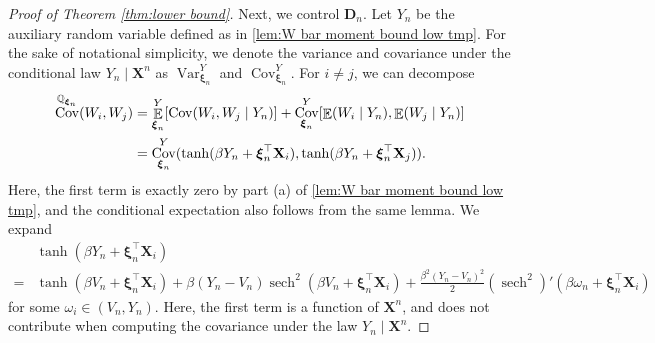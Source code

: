 \documentclass[preprint,reqno]{imsart}
\DeclareMathOperator{\sech}{sech}
\DeclareMathOperator{\EE}{\mathbb{E}}
\DeclareMathOperator{\Var}{Var}
\DeclareMathOperator{\Cov}{Cov}
\DeclareMathOperator{\QQ}{\mathbb{Q}}
\newcommand{\X}{\mathbf{X}}
\newcommand{\xxi}{\boldsymbol \xi}
\begin{document}
\begin{appendix}
\begin{proof}[Proof of Theorem \ref{thm:lower bound}]
\vspace{2mm}
Next, we control $\mathbf{D}_n$. Let $Y_n$ be the auxiliary random variable defined as in \cref{lem:W bar moment bound low tmp}.
%
%
%
For the sake of notational simplicity, we denote the variance and covariance under the conditional law $Y_n \mid \X^n$ as $\Var_{\xxi_n}^{Y}$ and $\Cov_{\xxi_n}^Y$.
For $i \neq j$, we can decompose
\begin{align}
    \Cov^{\QQ_{\xxi_n}} (W_i, W_j) &= \EE_{\xxi_n}^{Y} [\Cov (W_i, W_j \mid Y_n)] + \Cov_{\xxi_n}^{Y} [\EE (W_i \mid Y_n), \EE (W_j \mid Y_n)] \label{eq:cov} \\
    &= \Cov_{\xxi_n}^{Y} ( \tanh(\beta Y_n + \xxi_n^\top \X_i), \tanh(\beta Y_n + \xxi_n^\top \X_j) ). \notag
\end{align}
Here, the first term is exactly zero by part (a) of \cref{lem:W bar moment bound low tmp}, and the conditional expectation also follows from the same lemma.
We expand
\begin{align*}
&\tanh(\beta Y_n + \xxi_n^\top \X_i) \\
=& \tanh(\beta V_n + \xxi_n^\top \X_i) + \beta (Y_n - V_n) \sech^2(\beta V_n + \xxi_n^\top \X_i) + \frac{\beta^2 (Y_n - V_n)^2}{2} (\sech^2)'(\beta \omega_n + \xxi_n^\top \X_i)
%
\end{align*}
for some $\omega_i \in (V_n, Y_n)$. Here, the first term is a function of $\X^n$, and does not contribute when computing the covariance under the law $Y_n \mid \X^n$.
%


\end{proof}
\end{appendix}
\end{document}
